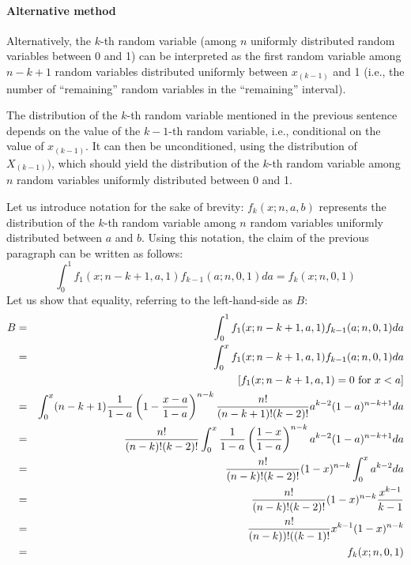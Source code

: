 \documentclass[12pt]{article} %
\begin{document}
\paragraph{Alternative method} Alternatively, the $k$-th random
variable (among $n$ uniformly distributed random variables between 0
and 1) can be interpreted as the first random variable among $n-k+1$
random variables distributed uniformly between $x_{(k-1)}$ and 1
(i.e., the number of ``remaining'' random variables in the
``remaining'' interval).\par
The distribution of the $k$-th random variable mentioned in the
previous sentence depends on the value of the $k-1$-th random
variable, i.e., conditional on the value of $x_{(k-1)}$. It can then
be unconditioned, using the distribution of $X_{(k-1)})$, which should
yield the distribution of the $k$-th random variable among $n$ random
variables uniformly distributed between 0 and 1.\par
Let us introduce notation for the sake of brevity: $f_k(x;n,a,b)$
represents the distribution of the $k$-th random variable among $n$
random variables uniformly distributed between $a$ and $b$. Using this
notation, the claim of the previous paragraph can be written as
follows:
\begin{equation}
\int_{0}^{1} f_1(x;n-k+1,a,1) f_{k-1}(a;n,0,1)da = f_k(x;n,0,1)
\end{equation}
Let us show that equality, referring to the left-hand-side as $B$:
\def\hs{\hspace{5em}}
\begin{eqnarray*}
B
& = & \int_{0}^{1} f_1(x;n-k+1,a,1) f_{k-1}(a;n,0,1)da \\
& = & \int_{0}^{x}  f_1(x;n-k+1,a,1) f_{k-1}(a;n,0,1)da \\
&   & \text{\hs[$f_1(x;n-k+1,a,1)=0$ for $x<a$]} \\
& = & \int_{0}^{x} (n-k+1)\frac{1}{1-a}\left(1-\frac{x-a}{1-a}\right)^{n-k} \frac{n!}{(n-k+1)!(k-2)!} a^{k-2} (1-a)^{n-k+1} da \\
& = & \frac{n!}{(n-k)!(k-2)!} \int_{0}^{x} \frac{1}{1-a} \left(\frac{1-x}{1-a}\right)^{n-k}  a^{k-2} (1-a)^{n-k+1} da \\
& = & \frac{n!}{(n-k)!(k-2)!} (1-x)^{n-k} \int_{0}^{x} a^{k-2} da \\
& = & \frac{n!}{(n-k)!(k-2)!} (1-x)^{n-k} \frac{x^{k-1}}{k-1} \\
& = & \frac{n!}{(n-k))!((k-1)!} x^{k-1} (1-x)^{n-k} \\
& = & f_k(x;n,0,1)
\end{eqnarray*}
%
%
\end{document}
